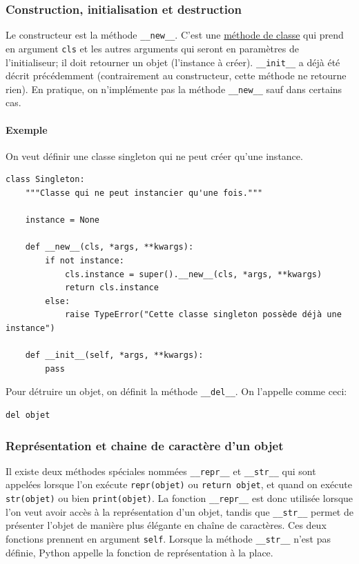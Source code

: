 \documentclass[a4paper, 10pt]{article}
\newcommand{\code}[1]{{\small\texttt{#1}}}
\begin{document}
\subsubsection{Construction, initialisation et destruction}
Le constructeur est la méthode \code{\_\_new\_\_}. C'est une \hyperref[sec:classmethod]{méthode de classe} qui prend en argument \code{cls} et les autres arguments qui seront en paramètres de l'initialiseur; il doit retourner un objet (l'instance à créer). \code{\_\_init\_\_} a déjà été décrit précédemment (contrairement au constructeur, cette méthode ne retourne rien). En pratique, on n'implémente pas la méthode \code{\_\_new\_\_} sauf dans certains cas.

\paragraph{Exemple} On veut définir une classe \og singleton \fg{} qui ne peut créer qu'une instance.

\begin{verbatim}
class Singleton:
    """Classe qui ne peut instancier qu'une fois."""

    instance = None

    def __new__(cls, *args, **kwargs):
        if not instance:
            cls.instance = super().__new__(cls, *args, **kwargs)
            return cls.instance
        else:
            raise TypeError("Cette classe singleton possède déjà une instance")

    def __init__(self, *args, **kwargs):
        pass
\end{verbatim}

Pour détruire un objet, on définit la méthode \code{\_\_del\_\_}. On l'appelle comme ceci:
\begin{verbatim}
del objet
\end{verbatim}

\subsubsection{Représentation et chaine de caractère d'un objet}
Il existe deux méthodes spéciales nommées \code{\_\_repr\_\_} et \code{\_\_str\_\_} qui sont appelées lorsque l'on exécute \code{repr(objet)} ou \code{return objet}, et quand on exécute \code{str(objet)} ou bien \code{print(objet)}. La fonction \code{\_\_repr\_\_} est donc utilisée lorsque l'on veut avoir accès à la représentation d'un objet, tandis que \code{\_\_str\_\_} permet de présenter l'objet de manière plus élégante en chaîne de caractères. Ces deux fonctions prennent en argument \code{self}. Lorsque la méthode \code{\_\_str\_\_} n'est pas définie, Python appelle la fonction de représentation à la place.
\end{document}
